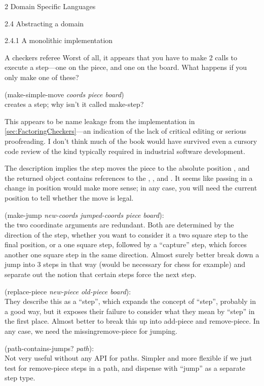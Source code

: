 \documentclass[12pt]{PalisadesLakesBook}
\begin{document}
\begin{plSection}{2 Domain Specific Languages}
\begin{plSection}{2.4 Abstracting a domain}
\begin{plSection}{2.4.1 A monolithic implementation}
\begin{plSection}{A checkers referee}
Worst of all, it appears that you have to make 2 calls
to execute a step---one on the piece, and one on the board.
What happens if you only make one of these?

{\schemeFont (make-simple-move {\itshape coords piece board})}\\
creates a step; why isn't it called {\schemeFont make-step}?

This appears to be name leakage from the implementation
in \cref{sec:FactoringCheckers}---an indication of the lack 
of critical editing or serious proofreading.
I don't think much of the book would have survived
even a cursory code review of the kind typically required
in industrial software development.

The description implies the step moves the piece to the
absolute position {},
and the returned object contains references to the 
{},
{},
and {}.
It seems like passing in a change in position 
would make more sense;
in any case, you will need the current position to tell
whether the move is legal.

{\schemeFont 
(make-jump {\itshape new-coords jumped-coords piece board})}:\\
the two coordinate arguments are redundant.
Both are determined by the direction of the step,
whether you want to consider it a two square step to the final
position, or a one square step, followed by a ``capture'' step,
which forces another one square step in the same direction.
Almost surely better break down a jump into 3 steps in that way
(would be necessary for chess for example)
and separate out the notion that certain steps 
force the next step.

{\schemeFont (replace-piece {\itshape new-piece old-piece board})}:\\
They describe this as a ``step'', 
which expands the concept of ``step'',
probably in a good way, but it exposes their failure to consider 
what they mean by ``step'' in the first place.
Almost better to break this up into {\schemeFont add-piece}
and {\schemeFont remove-piece}.
In any case, 
we need the missing{\schemeFont remove-piece} for jumping.

{\schemeFont (path-contains-jumps? {\itshape path})}:\\
Not very useful without any API for paths.
Simpler and more flexible if we 
just test for {\schemeFont remove-piece}
steps in a path, and dispense with ``jump''
as a separate step type.


\end{plSection}
\end{plSection}
\end{plSection}
\end{plSection}
\end{document}
